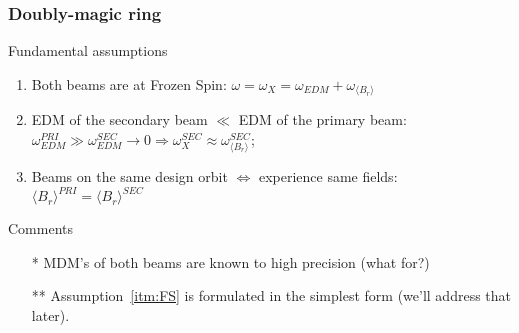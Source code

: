\documentclass{beamer}
\newcommand{\w}{\omega}
\newcommand{\avg}[1]{\langle{#1}\rangle}
\begin{document}
\begin{frame}\frametitle{Doubly-magic ring}%
  \begin{block}{Fundamental assumptions}
    \begin{enumerate}
    \item Both beams are at Frozen Spin: $\w = \w_X = \w_{EDM} + \w_{\avg{B_r}}$\label{itm:FS}
    \item EDM of the secondary beam $\ll$ EDM of the primary beam:
      $\w_{EDM}^{PRI} \gg \w_{EDM}^{SEC}\rightarrow 0 \Rightarrow \w_X^{SEC} \approx \w_{\avg{B_r}}^{SEC}$;
      \label{itm:small_EDM}
    \item Beams on the same design orbit $\Leftrightarrow$ experience same fields:
      $\avg{B_r}^{PRI} = \avg{B_r}^{SEC}$\label{itm:same_orbit}
    \end{enumerate}
  \end{block}
  \begin{block}{Comments}
    \begin{itemize}
    \item[*] MDM's of both beams are known to high precision (what for?)
    \item[**] Assumption~\ref{itm:FS} is formulated in the simplest form
      (we'll address that later).
    \end{itemize}
  \end{block}
\end{frame}
\end{document}
